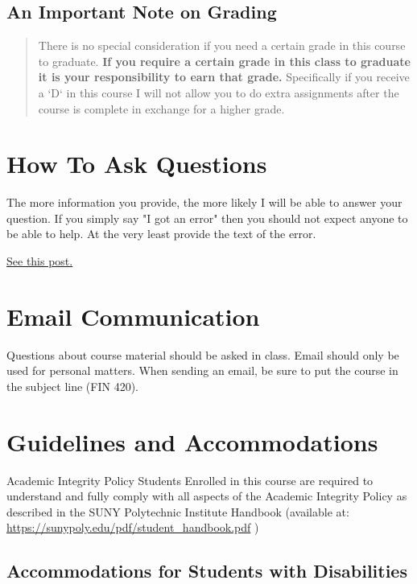 \documentclass[11pt]{article}
\begin{document}
\subsection{An Important Note on Grading}
\label{sec:orgf00abf6}

\begin{quote}
There is no special consideration if you need a certain grade in this course to graduate.  \textbf{\textbf{If you require a certain grade in this class to graduate it is your responsibility to earn that grade.}} Specifically if you receive a `D` in this course I will not allow you to do extra assignments after the course is complete in exchange for a higher grade. 
\end{quote}
\section{How To Ask Questions}
\label{sec:org3f0bc81}

The more information you provide, the more likely I will be able to answer your question.  If you simply say "I got an error" then you should not expect anyone to be able to help.  At the very least provide the text of the error.

\href{https://stackoverflow.com/help/how-to-ask}{See this post.}  
\section{Email Communication}
\label{sec:orgfc50659}

Questions about course material should be asked in class.  Email should only be used for personal matters.  When sending an email, be sure to put the course in the subject line (FIN 420). 
\section{Guidelines and Accommodations}
\label{sec:orga0de6fb}

Academic Integrity Policy Students Enrolled in this course are required to understand and fully comply with all aspects of the Academic Integrity Policy as described in the SUNY Polytechnic Institute Handbook (available at:  \url{https://sunypoly.edu/pdf/student\_handbook.pdf} )
\subsection{Accommodations for Students with Disabilities}
\label{sec:orgc3a4128}
\end{document}
